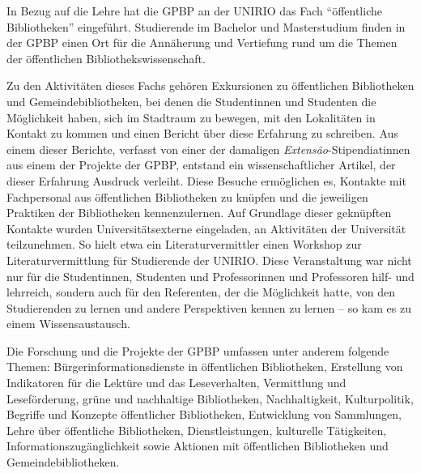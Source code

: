 \documentclass[a4paper,
fontsize=11pt,
oneside,
numbers=noperiodatend,
parskip=half-,
bibliography=totoc,
final
]{scrartcl}
\begin{document}
In Bezug auf die Lehre hat die GPBP an der UNIRIO das Fach
\enquote{öffentliche Bibliotheken} eingeführt. Studierende im Bachelor
und Masterstudium finden in der GPBP einen Ort für die Annäherung und
Vertiefung rund um die Themen der öffentlichen Bibliothekswissenschaft.

Zu den Aktivitäten dieses Fachs gehören Exkursionen zu öffentlichen
Bibliotheken und Gemeindebibliotheken, bei denen die Studentinnen und
Studenten die Möglichkeit haben, sich im Stadtraum zu bewegen, mit den
Lokalitäten in Kontakt zu kommen und einen Bericht über diese Erfahrung
zu schreiben. Aus einem dieser Berichte, verfasst von einer der
damaligen \emph{Extensão}-Stipendiatinnen aus einem der Projekte der
GPBP, entstand ein wissenschaftlicher Artikel, der dieser Erfahrung
Ausdruck verleiht. Diese Besuche ermöglichen es, Kontakte mit
Fachpersonal aus öffentlichen Bibliotheken zu knüpfen und die jeweiligen
Praktiken der Bibliotheken kennenzulernen. Auf Grundlage dieser
geknüpften Kontakte wurden Universitätsexterne eingeladen, an
Aktivitäten der Universität teilzunehmen. So hielt etwa ein
Literaturvermittler einen Workshop zur Literaturvermittlung für
Studierende der UNIRIO. Diese Veranstaltung war nicht nur für die
Studentinnen, Studenten und Professorinnen und Professoren hilf- und
lehrreich, sondern auch für den Referenten, der die Möglichkeit hatte,
von den Studierenden zu lernen und andere Perspektiven kennen zu lernen
-- so kam es zu einem Wissensaustausch.

Die Forschung und die Projekte der GPBP umfassen unter anderem folgende
Themen: Bürgerinformationsdienste in öffentlichen Bibliotheken,
Erstellung von Indikatoren für die Lektüre und das Leseverhalten,
Vermittlung und Leseförderung, grüne und nachhaltige Bibliotheken,
Nachhaltigkeit, Kulturpolitik, Begriffe und Konzepte öffentlicher
Bibliotheken, Entwicklung von Sammlungen, Lehre über öffentliche
Bibliotheken, Dienstleistungen, kulturelle Tätigkeiten,
Informationszugänglichkeit sowie Aktionen mit öffentlichen Bibliotheken
und Gemeindebibliotheken.
\end{document}
